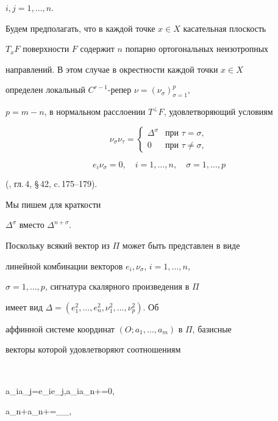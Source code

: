 $i,j=1,\ldots,n$.





Будем предполагать, что в каждой точке $x\in X$ касательная плоскость


$T_xF$ поверхности $F$ содержит $n$ попарно ортогональных неизотропных


направлений. В этом случае в окрестности каждой точки $x\in X$


определен локальный $C^{r-1}$-репер $\nu=(\nu_{\sigma})_{\sigma=1}^p$,


$p=m-n$, в нормальном расслоении $T^{\bot}F$, удовлетворяющий условиям


\begin{equation}


\nu_{\sigma}\nu_{\tau}=


\begin{cases}


\Delta^{\sigma} & \text{при }\tau=\sigma,\\


0 & \text{при }\tau\ne\sigma,


\end{cases}


\end{equation}


$$


e_i\nu_{\sigma}=0,\quad i=1,\dotsc,n,\quad \sigma=1,\dotsc,p


$$


(\cite{Eis}, гл.\,4, \S\,42, c.\,175--179).


Мы пишем для краткости


$\Delta^{\sigma}$ вместо $\Delta^{n+\sigma}$.


Поскольку всякий вектор из $\Pi$ может быть представлен в виде


линейной комбинации векторов $e_i,\nu_{\sigma}$, $i=1,\dotsc,n$,


$\sigma=1,\dotsc,p$, сигнатура скалярного произведения в $\Pi$


имеет вид $\Delta=(e_1^2,\dotsc,e_n^2,\nu_1^2,\ldots,\nu_p^2)$. Об


аффинной системе координат $(O;a_1,\dotsc,a_m)$ в $\Pi$, базисные


векторы которой удовлетворяют соотношениям


$$


a_ia_j=e_ie_j,\quad a_ia_{n+\sigma}=0,\quad


a_{n+\sigma}a_{n+\tau}=\nu_{\sigma}\nu_{\tau},\quad


